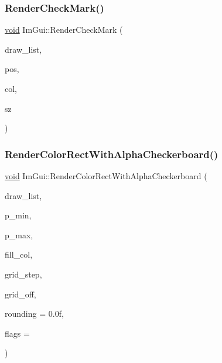 \subsubsection{\texorpdfstring{Render\+Check\+Mark()}{RenderCheckMark()}}
{\footnotesize\ttfamily \hyperlink{imgui__impl__opengl3__loader_8h_ac668e7cffd9e2e9cfee428b9b2f34fa7}{void} Im\+Gui\+::\+Render\+Check\+Mark (\begin{DoxyParamCaption}\item[{\hyperlink{structImDrawList}{Im\+Draw\+List} $\ast$}]{draw\+\_\+list,  }\item[{\hyperlink{structImVec2}{Im\+Vec2}}]{pos,  }\item[{Im\+U32}]{col,  }\item[{float}]{sz }\end{DoxyParamCaption})}

\mbox{\label{namespaceImGui_a1c7b45570a114af08b0c2e16a7acceae}} 
\subsubsection{\texorpdfstring{Render\+Color\+Rect\+With\+Alpha\+Checkerboard()}{RenderColorRectWithAlphaCheckerboard()}}
{\footnotesize\ttfamily \hyperlink{imgui__impl__opengl3__loader_8h_ac668e7cffd9e2e9cfee428b9b2f34fa7}{void} Im\+Gui\+::\+Render\+Color\+Rect\+With\+Alpha\+Checkerboard (\begin{DoxyParamCaption}\item[{\hyperlink{structImDrawList}{Im\+Draw\+List} $\ast$}]{draw\+\_\+list,  }\item[{\hyperlink{structImVec2}{Im\+Vec2}}]{p\+\_\+min,  }\item[{\hyperlink{structImVec2}{Im\+Vec2}}]{p\+\_\+max,  }\item[{Im\+U32}]{fill\+\_\+col,  }\item[{float}]{grid\+\_\+step,  }\item[{\hyperlink{structImVec2}{Im\+Vec2}}]{grid\+\_\+off,  }\item[{float}]{rounding = {\ttfamily 0.0f},  }\item[{Im\+Draw\+Flags}]{flags = {} }\end{DoxyParamCaption})}

